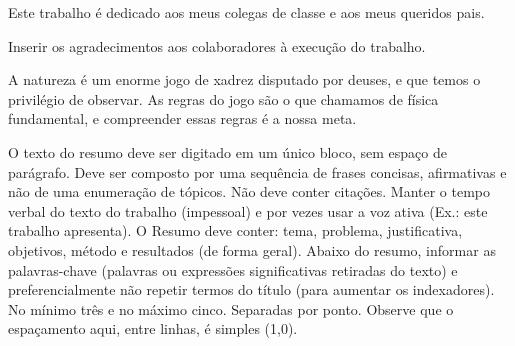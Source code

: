 \documentclass[
	12pt,				%
	oneside,			%
	a4paper,			%
	chapter=TITLE,		%
	section=TITLE,		%
	english,			%
	brazil,				%
	]{abntex2}
\begin{document}

\imprimircapa

\imprimirfolhaderosto

\begin{folhadeaprovacao}
\end{folhadeaprovacao}

\begin{dedicatoria}
    Este trabalho é dedicado aos meus colegas de classe e aos meus queridos pais.
\end{dedicatoria}

\begin{agradecimentos}
    Inserir os agradecimentos aos colaboradores à execução do trabalho.
\end{agradecimentos}

\begin{epigrafe}
    \aspas
    A natureza é um enorme jogo de xadrez disputado por deuses, e que temos o privilégio de observar.
    As regras do jogo são o que chamamos de física fundamental, e compreender essas regras é a nossa meta.
    \aspas
\end{epigrafe}

\begin{resumo}
    O texto do resumo deve ser digitado em um único bloco, sem espaço de parágrafo. Deve ser composto por uma sequência de frases concisas, afirmativas e não de uma enumeração de tópicos. Não deve conter citações. Manter o tempo verbal do texto do trabalho (impessoal) e por vezes usar a voz ativa (Ex.: este trabalho apresenta). O Resumo deve conter: tema, problema, justificativa, objetivos, método e resultados (de forma geral). Abaixo do resumo, informar as palavras-chave (palavras ou expressões significativas retiradas do texto) e preferencialmente não repetir termos do título (para aumentar os indexadores). No mínimo três e no máximo cinco. Separadas por ponto. Observe que o espaçamento aqui, entre linhas, é simples (1,0).

\end{resumo}
\end{document}
